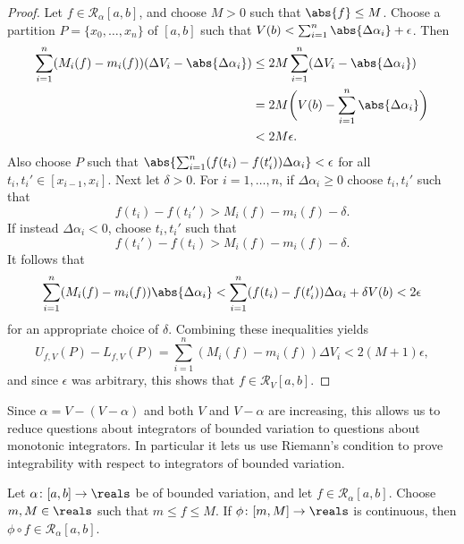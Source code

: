 \documentclass[article, a4paper, 11pt, oneside]{memoir}
\numberwithin{equation}{chapter}
\newcommand{\calR}{\mathcal{R}}
\begin{document}
\begin{proof}
    Let $f \in \calR_\alpha[a,b]$, and choose $M > 0$ such that $\abs{f} \leq M$. Choose a partition $P = \{x_0, \ldots, x_n\}$ of $[a,b]$ such that $V(b) < \sum_{i=1}^n \abs{\Delta\alpha_i} + \epsilon$. Then
    \begin{align*}
        \sum_{i=1}^n (M_i(f) - m_i(f)) ( \Delta V_i - \abs{\Delta\alpha_i})
            &\leq 2M \sum_{i=1}^n (\Delta V_i - \abs{\Delta\alpha_i}) \\
            &= 2M \biggl( V(b) - \sum_{i=1}^n \abs{\Delta\alpha_i} \biggr) \\
            &< 2M \epsilon.
    \end{align*}
    Also choose $P$ such that $\abs{ \sum_{i=1}^n (f(t_i) - f(t_i')) \Delta\alpha_i } < \epsilon$ for all $t_i, t_i' \in [x_{i-1}, x_i]$. Next let $\delta > 0$. For $i = 1, \ldots, n$, if $\Delta\alpha_i \geq 0$ choose $t_i, t_i'$ such that
    \begin{equation*}
        f(t_i) - f(t_i')
            > M_i(f) - m_i(f) - \delta.
    \end{equation*}
    If instead $\Delta\alpha_i < 0$, choose $t_i, t_i'$ such that
    \begin{equation*}
        f(t_i') - f(t_i)
            > M_i(f) - m_i(f) - \delta.
    \end{equation*}
    It follows that
    \begin{equation*}
        \sum_{i=1}^n (M_i(f) - m_i(f)) \abs{\Delta\alpha_i}
            < \sum_{i=1}^n (f(t_i) - f(t_i')) \Delta\alpha_i
              + \delta V(b)
            < 2 \epsilon
    \end{equation*}
    for an appropriate choice of $\delta$. Combining these inequalities yields
    \begin{equation*}
        U_{f,V}(P) - L_{f,V}(P)
            = \sum_{i=1}^n (M_i(f) - m_i(f)) \Delta V_i
            < 2(M+1)\epsilon,
    \end{equation*}
    and since $\epsilon$ was arbitrary, this shows that $f \in \calR_V[a,b]$.
\end{proof}
%
Since $\alpha = V - (V - \alpha)$ and both $V$ and $V - \alpha$ are increasing, this allows us to reduce questions about integrators of bounded variation to questions about monotonic integrators. In particular it lets us use Riemann's condition to prove integrability with respect to integrators of bounded variation. 


\begin{proposition}
    Let $\alpha \colon [a,b] \to \reals$ be of bounded variation, and let $f \in \calR_\alpha[a,b]$. Choose $m,M \in \reals$ such that $m \leq f \leq M$. If $\phi \colon [m,M] \to \reals$ is continuous, then $\phi \circ f \in \calR_\alpha[a,b]$.
\end{proposition}
\end{document}

